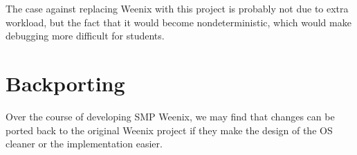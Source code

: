 \documentclass{article}
\begin{document}
The case against replacing Weenix with this project is probably not due to extra workload, but the fact 
that it would become nondeterministic, which would make debugging more difficult for students.

\section{Backporting}

Over the course of developing SMP Weenix, we may find that changes can be ported back to the original
Weenix project if they make the design of the OS cleaner or the implementation easier.
\end{document}
